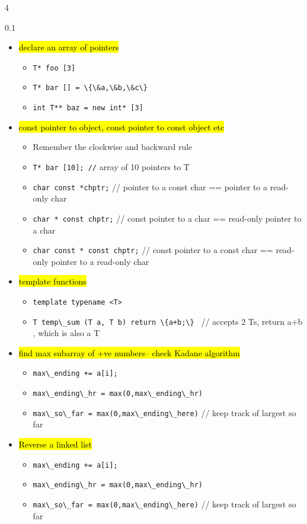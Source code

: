 \documentclass[10pt,landscape,a4paper]{article}
\newcommand{\cicode}[1]{\colorbox{highlightgray}{\lstinline[basicstyle=\ttfamily\color{black}]|#1|} }
\begin{document}
\begin{multicols*}{4}
\begin{spacing}{0.1}
\begin{itemize}
\item \hl{declare an array of pointers}
\begin{itemize}
	\item \cicode{T* foo [3]}
	\item \cicode{T* bar [] = \{\&a,\&b,\&c\} }
	\item \cicode{int T** baz = new int* [3]}
\end{itemize}

\item \hl{const pointer to object, const pointer to const object etc}
\begin{itemize}
	\item Remember the clockwise and backward rule
	\item \cicode{T* bar [10]; //} array of 10 pointers to T
	\item \cicode{char const *chptr;} // pointer to a const char == pointer to a read-only char
	\item \cicode{char * const chptr;} // const pointer to a char == read-only pointer to a char
	\item \cicode{char const * const chptr;} // const pointer to a const char == read-only pointer to a read-only char
\end{itemize}

\item \hl{template functions }
\begin{itemize}[label={}]
\item \cicode{template typename <T> }
\item \cicode{T temp\_sum (T a, T b) return \{a+b;\} } // accepts 2 Ts, return a+b , which is also a T
\end{itemize}

\item \hl{find max subarray of +ve numbers-- check Kadane algorithm}
\begin{itemize}[label={}]
	\item \cicode{max\_ending += a[i];}
	\item \cicode{max\_ending\_hr = max(0,max\_ending\_hr)}
	\item \cicode{max\_so\_far = max(0,max\_ending\_here)} // keep track of largest so far	
\end{itemize}

\item \hl{Reverse a linked list}
\begin{itemize}[label={}]
	\item \cicode{max\_ending += a[i];}
	\item \cicode{max\_ending\_hr = max(0,max\_ending\_hr)}
	\item \cicode{max\_so\_far = max(0,max\_ending\_here)} // keep track of largest so far	
\end{itemize}


\end{itemize}
\end{spacing}
\end{multicols*}
\end{document}
